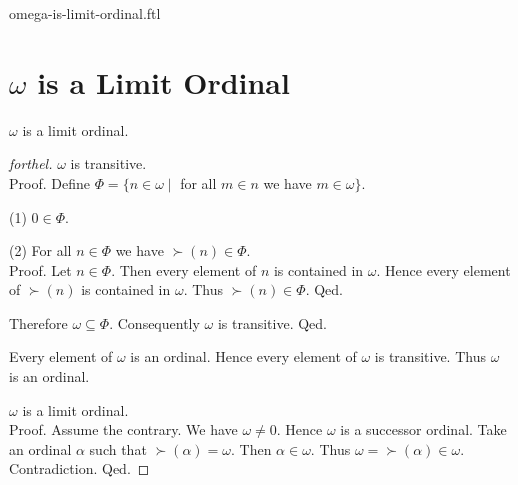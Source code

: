 \documentclass{naproche-library}
\begin{document}
\begin{smodule}{omega-is-limit-ordinal.ftl}

  \section*{$\omega$ is a Limit Ordinal}

  \begin{proposition}[forthel,id=SET_THEORY_03_764451995254784]
    $\omega$ is a limit ordinal.
  \end{proposition}
  \begin{proof}[forthel]
    $\omega$ is transitive. \\
    Proof.
      Define $\Phi = \{ n \in \omega \mid$ for all $m \in n$ we have $m \in \omega \}$.

      (1) $0 \in \Phi$.

      (2) For all $n \in \Phi$ we have $\succ(n) \in \Phi$. \\
      Proof.
        Let $n \in \Phi$.
        Then every element of $n$ is contained in $\omega$.
        Hence every element of $\succ(n)$ is contained in $\omega$.
        Thus $\succ(n) \in \Phi$.
      Qed.

      Therefore $\omega \subseteq \Phi$.
      Consequently $\omega$ is transitive.
    Qed.

    Every element of $\omega$ is an ordinal.
    Hence every element of $\omega$ is transitive.
    Thus $\omega$ is an ordinal.

    $\omega$ is a limit ordinal. \\
    Proof.
      Assume the contrary.
      We have $\omega \neq 0$.
      Hence $\omega$ is a successor ordinal.
      Take an ordinal $\alpha$ such that $\succ(\alpha) = \omega$.
      Then $\alpha \in \omega$.
      Thus $\omega = \succ(\alpha) \in \omega$.
      Contradiction.
    Qed.
  \end{proof}
\end{smodule}
\end{document}
